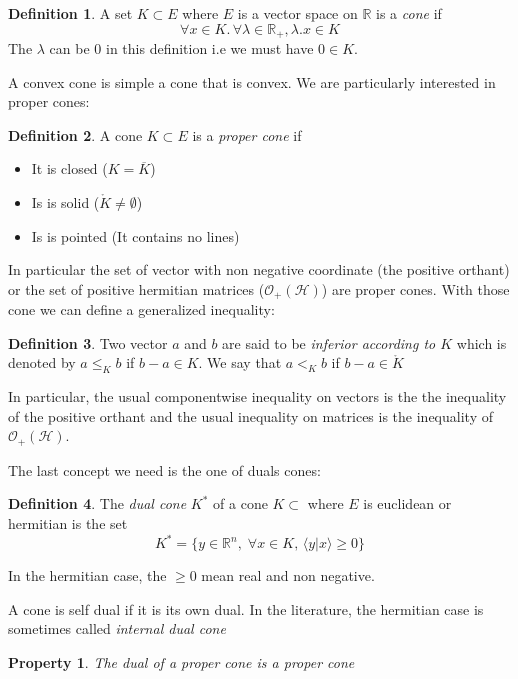 \documentclass[10pt]{report}
\theoremstyle{plain}
\newtheorem{prop}[thm]{Property}
\theoremstyle{definition}
\newtheorem{defn}{Definition}[chapter]
\theoremstyle{remark}
\newcommand{\R}{\ensuremath{\mathbb{R}}}
\newcommand{\braket}[2]{\langle#1|#2\rangle}
\renewcommand{\geq}{\geqslant}
\renewcommand{\leq}{\leqslant}
\begin{document}
\begin{defn}
  A set $K \subset E$ where $E$ is a vector space on $\R$ is a \emph{cone} if
  \[\forall x \in K.\, \forall \lambda \in \R_+, \lambda.x  \in K\]
  The $\lambda$ can be 0 in this definition i.e we must have $0 \in K$.
\end{defn}

A convex cone is simple a cone that is convex. We are particularly interested in
proper cones:

\begin{defn}
  A cone $K \subset E$ is a \emph{proper cone} if
  \begin{itemize}
    \item It is closed ($K = \overline K$)
    \item Is is solid ($ \mathring K \neq \emptyset$)
    \item Is is pointed (It contains no lines)
  \end{itemize}
\end{defn}

In particular the set of vector with non negative coordinate (the positive orthant) or the set of
positive hermitian matrices ($\mathcal{O}_+(\mathcal{H})$) are proper cones. With those cone we can define a
generalized inequality:

\begin{defn}
  Two vector $a$ and $b$ are said to be \emph{inferior according to $K$} which is denoted by $a
  \leq_K b$ if $b - a \in K$. We say that $a <_K b$ if $b - a \in \mathring K$
\end{defn}

In particular, the usual componentwise inequality on vectors is the the
inequality of the positive orthant and the usual inequality on matrices is the
inequality of $\mathcal{O}_+(\mathcal{H})$.

The last concept we need is the one of duals cones:

\begin{defn}
  The \emph{dual cone} $K^*$ of a cone $K \subset$ where $E$ is euclidean or hermitian is the set
  \[ K^* = \{y \in \R^n,\; \forall x \in K,\, \braket y x \geq 0\}\]

  In the hermitian case, the $\geq 0$ mean real and non negative.
\end{defn}

A cone is self dual if it is its own dual. In the literature, the hermitian case
is sometimes called \emph{internal dual cone}

\begin{prop}
  The dual of a proper cone is a proper cone
\end{prop}
\end{document}
